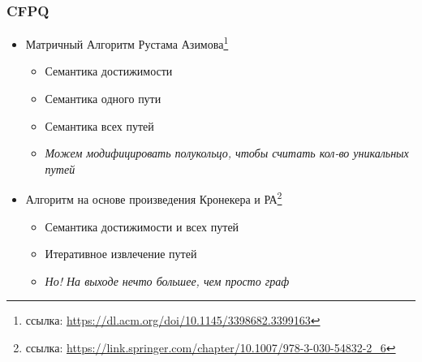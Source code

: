 \documentclass[xcolor=table,english]{beamer}
\begin{document}
\begin{frame}[fragile] \frametitle{CFPQ}
    \begin{itemize}
        \item Матричный Алгоритм Рустама Азимова\footnote{ссылка: \href{https://dl.acm.org/doi/10.1145/3398682.3399163}{https://dl.acm.org/doi/10.1145/3398682.3399163}}
        {
            \begin{itemize}
                \item Семантика достижимости
                \item Семантика одного пути
                \item Семантика всех путей
                \item \textit{Можем модифицировать полукольцо, чтобы считать кол-во уникальных путей}
            \end{itemize}
        }
        \item Алгоритм на основе произведения Кронекера и РА\footnote{ссылка: \href{https://link.springer.com/chapter/10.1007/978-3-030-54832-2\_6}{https://link.springer.com/chapter/10.1007/978-3-030-54832-2\_6}}
        {
            \begin{itemize}
                \item Семантика достижимости и всех путей
                \item Итеративное извлечение путей
                \item \textit{Но! На выходе нечто большее, чем просто граф}
            \end{itemize}
        }
    \end{itemize}
\end{frame}
\end{document}
